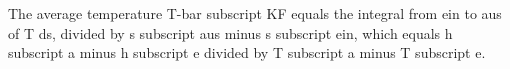 The average temperature T-bar subscript KF equals the integral from ein to aus of T ds, divided by s subscript aus minus s subscript ein, which equals h subscript a minus h subscript e divided by T subscript a minus T subscript e.